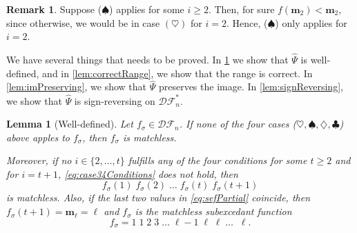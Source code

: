 \documentclass[reqno]{amsart}
\newtheorem{lemma}[theorem]{Lemma}
\theoremstyle{definition}
\newtheorem{remark}[theorem]{Remark}
\newcommand{\DSEF}{\mathcal{DF}}%
\newcommand{\fretherD}{\hat{\Psi}}
\newcommand{\caseOne}{\ensuremath{\heartsuit}}
\newcommand{\caseTwo}{\ensuremath{\spadesuit}}
\newcommand{\caseThree}{\ensuremath{\diamondsuit}}
\newcommand{\caseFour}{\ensuremath{\clubsuit}}
\newcommand{\img}{\mathbf{m}}
\begin{document}
\begin{remark}\label{rem:case2}
 Suppose (\caseTwo) applies for some $i \geq 2$.
 Then, for sure $f(\img_2) < \img_2$, since otherwise, we would be in case $(\caseOne)$ for $i=2$.
 Hence, (\caseTwo) only applies for $i=2$.
\end{remark}



We have several things that needs to be proved.
In \cref{lem:fretherDIsWellDefined} we show that $\fretherD$ is well-defined,
and in \cref{lem:correctRange}, we show that the range is correct.
%
In \cref{lem:imPreserving}, we show that $\fretherD$ preserves the image.
In \cref{lem:signReversing}, we show that $\fretherD$ is sign-reversing on $\DSEF^*_n$.

\begin{lemma}[Well-defined]\label{lem:fretherDIsWellDefined}
Let $f_\sigma \in \DSEF_n$. If none of the four cases 
($\caseOne,\caseTwo,\caseThree,\caseFour$) above
apples to $f_\sigma$, then $f_\sigma$ is matchless.

Moreover, if no $i \in \{2,\dotsc,t\}$ fulfills any of the four
conditions for some $t\geq 2$ and for $i=t+1$, \eqref{eq:case34Conditions} does not hold,
then 
\begin{equation}\label{eq:sefPartial}
 f_\sigma(1)\; f_\sigma(2)\; \dotsc \; f_\sigma(t)  \; f_\sigma(t+1) 
\end{equation}
is matchless. Also, if the last two values in \eqref{eq:sefPartial} coincide,
then $f_\sigma(t+1)  = \img_\ell = \ell$ and $f_\sigma$ is the matchless subexcedant function
\begin{equation}\label{eq:sefMatchless}
 f_\sigma = 1\; 1\;2\;3\; \dotsc \; \ell{-}1 \; \ell \; \ell \; \dotsc \; \; \ell.
\end{equation}
\end{lemma}
%
\end{document}
